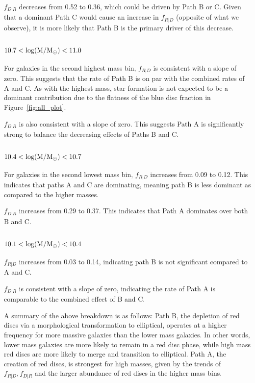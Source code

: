 \documentclass[useAMS,usenatbib]{mn2e}
\begin{document}
$f_{D|R}$ decreases from 0.52 to 0.36, which could be driven by Path B or C. Given that a dominant Path C would cause an increase in $f_{R|D}$ (opposite of what we observe), it is more likely that Path B is the primary driver of this decrease. 

\subsubsection{$\rm 10.7<log(M/M_{\odot})<11.0$}

For galaxies in the second highest mass bin, $f_{R|D}$ is consistent with a slope of zero. This suggests that the rate of Path B is on par with the combined rates of A and C. As with the highest mass, star-formation is not expected to be a dominant contribution due to the flatness of the blue disc fraction in Figure~\ref{fig:all_plot}. 

$f_{D|R}$ is also consistent with a slope of zero. This suggests Path A is significantly strong to balance the decreasing effects of Paths B and C. 

\subsubsection{$\rm 10.4<log(M/M_{\odot})<10.7$}

For galaxies in the second lowest mass bin, $f_{R|D}$ increases from 0.09 to 0.12. This indicates that paths A and C are dominating, meaning path B is less dominant as compared to the higher masses. 

$f_{D|R}$ increases from 0.29 to 0.37. This indicates that Path A dominates over both B and C.  

\subsubsection{$\rm 10.1<log(M/M_{\odot})<10.4$}

$f_{R|D}$ increases from 0.03 to 0.14, indicating path B is not significant compared to A and C. 

$f_{D|R}$ is consistent with a slope of zero, indicating the rate of Path A is comparable to the combined effect of B and C. 

A summary of the above breakdown is as follows: Path B, the depletion of red discs via a morphological transformation to elliptical, operates at a higher frequency for more massive galaxies than the lower mass galaxies. In other words, lower mass galaxies are more likely to remain in a red disc phase, while high mass red discs are more likely to merge and transition to elliptical. Path A, the creation of red discs, is strongest for high masses, given by the trends of $f_{R|D},f_{D|R}$ and the larger abundance of red discs in the higher mass bins.  
\end{document}
